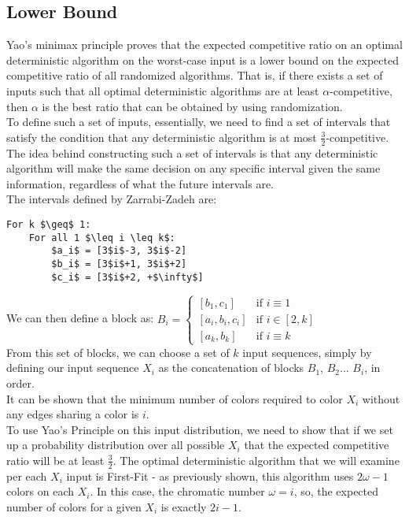 \subsection{Lower Bound}
Yao's minimax principle proves that the expected competitive ratio on an optimal deterministic algorithm on the worst-case input is a lower bound on the expected competitive ratio of all randomized algorithms. That is, if there exists a set of inputs such that all optimal deterministic algorithms are at least $\alpha$-competitive, then $\alpha$ is the best ratio that can be obtained by using randomization.
\\To define such a set of inputs, essentially, we need to find a set of intervals that satisfy the condition that any deterministic algorithm is at most $\frac{3}{2}$-competitive. The idea behind constructing such a set of intervals is that any deterministic algorithm will make the same decision on any specific interval given the same information, regardless of what the future intervals are.
\\The intervals defined by Zarrabi-Zadeh are: 
\begin{Verbatim}[commandchars=\\\{\},codes={\catcode`$=3\catcode`_=8}]
For k $\geq$ 1:
    For all 1 $\leq i \leq k$:
        $a_i$ = [3$i$-3, 3$i$-2]
        $b_i$ = [3$i$+1, 3$i$+2]
        $c_i$ = [3$i$+2, +$\infty$]
\end{Verbatim}
We can then define a block as:
$B_i = \begin{cases} [b_1, c_1] &\mbox{if } i \equiv 1 \\ 
[a_i, b_i, c_i] & \mbox{if } i \in [2,k] \\ [a_k, b_k] &\mbox{if } i \equiv k \end{cases}$ 
\\From this set of blocks, we can choose a set of $k$ input sequences, simply by defining our input sequence $X_i$ as the concatenation of blocks $B_1$, $B_2$... $B_i$, in order.
\\It can be shown that the minimum number of colors required to color $X_i$ without any edges sharing a color is $i$.
\\To use Yao's Principle on this input distribution, we need to show that if we set up a probability distribution over all possible $X_i$ that the expected competitive ratio will be at least $\frac{3}{2}$. The optimal deterministic algorithm that we will examine per each $X_i$ input is First-Fit - as previously shown, this algorithm uses $2\omega-1$ colors on each $X_i$. In this case, the chromatic number $\omega=i$, so, the expected number of colors for a given $X_i$ is exactly $2i-1$.
